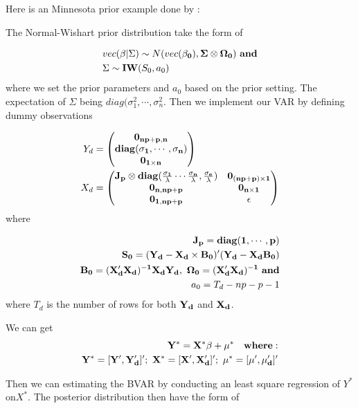 \documentclass[11pt,a4paper,]{article}
\begin{document}
Here is an Minnesota prior example done by \textcite{anderson2020}:

The Normal-Wishart prior distribution take the form of

\[
\begin{aligned}
&vec(\mathbf{\beta}|\Sigma)\sim N(vec(\bf{\beta_0}),\Sigma\otimes\Omega_0)\ and\\
&\Sigma\sim\mathbf{IW}(S_0,a_0)
\end{aligned}
\] where we set the prior parameters and \(a_0\) based on the prior setting. The expectation of \(\Sigma\) being \(diag(\sigma^2_1,\cdots,\sigma^2_n\). Then we implement our VAR by defining dummy observations

\[
\begin{aligned}
Y_d&=
\begin{pmatrix}
\bf0_{np+p,n}\\
\bf diag(\bf{\sigma_1,\cdots,\sigma_n})\\
\bf0_{1\times n}
\end{pmatrix}\\
X_d&=
\begin{pmatrix}
\bf{J_p}\otimes diag(\frac{\sigma_1}{\lambda}\cdots\frac{\sigma_n}{\lambda},\frac{\sigma_e}{\lambda})&\bf0_{(np+p)\times1}\\
\bf 0_{n,np+p}&\bf 0_{n\times1}
\\
\bf 0_{1,np+p}&\bf \epsilon
\end{pmatrix}
\end{aligned}
\] where

\[
\begin{aligned}
\bf{J_p}=diag(1,\cdots,p)\\
\bf{S_0}=(Y_d-X_d\times B_0)'(Y_d-X_dB_0)\\
\bf{B_0}=(X_d'X_d)^{-1}X_dY_d,\ \Omega_0=(X_d'X_d)^{-1}\  and\\
a_0=T_d-np-p-1\\
\end{aligned}
\] where \(T_d\) is the number of rows for both \(\bf{Y}_d\) and \(\bf{X}_d\).

We can get \[
\begin{aligned}
\bf{Y^*}=\bf{X^*}\bf{\beta}+\bf{\mu}^*\ \ \  where: \\
\bf{Y^*}=[\bf{Y'},\bf{Y'_d}]';\ \bf{X^*}=[\bf{X'},\bf{X'_d}]';\ \bf{\mu^*}=[\bf{\mu'},\bf{\mu'_d}]'
\end{aligned}
\]

Then we can estimating the BVAR by conducting an least square regression of \(Y^*\) on\(X^*\). The posterior distribution then have the form of
\end{document}
